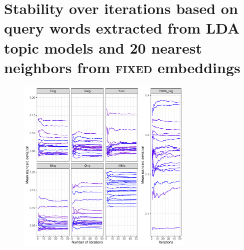 \chapter{Stability over iterations based on query words extracted from LDA topic models and 20 nearest neighbors from \textsc{fixed} embeddings}

\begin{figure}[H]
    \centering
    \includegraphics[width=0.75\textwidth,keepaspectratio]{figures/stability_plot_mean_std}
  \end{figure}
